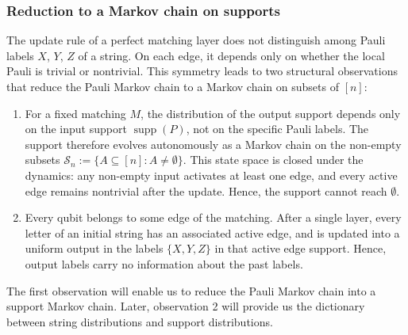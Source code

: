 \documentclass[
    aps,
    superscriptaddress,
    onecolumn,
    10pt,
    prx,
    nofootinbib
]{revtex4-2}
\theoremstyle{namedstatement}
\theoremstyle{plain}
\begin{document}
\subsubsection{Reduction to a Markov chain on supports} 
\label{sec:supports}
The update rule of a perfect matching layer does not distinguish among Pauli labels $X$, $Y$, $Z$ of a string. On each edge, it depends only on whether the local Pauli is trivial or nontrivial. This symmetry leads to two structural observations that reduce the Pauli Markov chain to a Markov chain on subsets of $[n]$:
 \begin{enumerate}
     \item For a fixed matching $M$, the distribution of the output support depends only on the input support $\operatorname{supp}(P)$, not on the specific Pauli labels. The support therefore evolves autonomously as a Markov chain on the non-empty subsets $\mathcal{S}_n := \{A \subseteq [n] : A \neq \emptyset\}$. 
     This state space is closed under the dynamics: any non-empty input activates at least one edge, and every active edge remains nontrivial after the update. Hence, the support cannot reach $\emptyset$.
\item Every qubit belongs to some edge of the matching. After a single layer, every letter of an initial string has an associated active edge, and is updated into a uniform output in the labels $\{X,Y,Z\}$ in that active edge support. Hence, output labels carry no information about the past labels. 
 \end{enumerate}
The first observation will enable us to reduce the Pauli Markov chain into a support Markov chain. Later, observation 2 will provide us the dictionary between string distributions and support
distributions.
\end{document}
